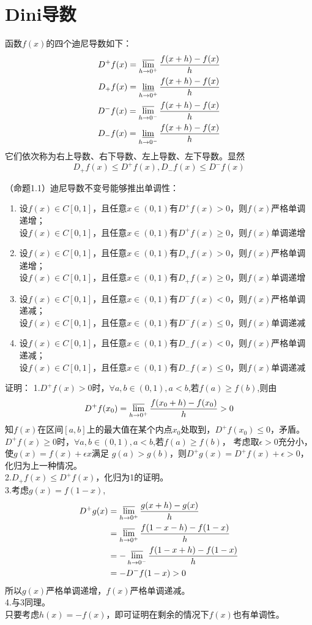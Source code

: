 \documentclass{ctexart}
\begin{document}
\section{Dini导数}
函数$f(x)$的四个迪尼导数如下：
\begin{align}
    D^+f(x)=\varlimsup_{h\to 0^+}\frac{f(x+h)-f(x)}{h} \\
    D_+f(x)=\varliminf_{h\to 0^+}\frac{f(x+h)-f(x)}{h} \\
    D^-f(x)=\varlimsup_{h\to 0^-}\frac{f(x+h)-f(x)}{h} \\
    D_-f(x)=\varliminf_{h\to 0^-}\frac{f(x+h)-f(x)}{h}
\end{align}
它们依次称为右上导数、右下导数、左上导数、左下导数。显然
\[D_+f(x)\leq D^+f(x),D_-f(x)\leq D^-f(x)\]

（命题1.1）迪尼导数不变号能够推出单调性：
\begin{enumerate}
    \item 设$f(x)\in C[0,1]$，且任意$x\in (0,1)$有$D^+f(x)>0$，则$f(x)$严格单调递增；\\
          设$f(x)\in C[0,1]$，且任意$x\in (0,1)$有$D^+f(x)\geq 0$，则$f(x)$单调递增
    \item 设$f(x)\in C[0,1]$，且任意$x\in (0,1)$有$D_+f(x)>0$，则$f(x)$严格单调递增；\\
          设$f(x)\in C[0,1]$，且任意$x\in (0,1)$有$D_+f(x)\geq 0$，则$f(x)$单调递增
    \item 设$f(x)\in C[0,1]$，且任意$x\in (0,1)$有$D^-f(x)<0$，则$f(x)$严格单调递减；\\
          设$f(x)\in C[0,1]$，且任意$x\in (0,1)$有$D^-f(x)\leq 0$，则$f(x)$单调递减
    \item 设$f(x)\in C[0,1]$，且任意$x\in (0,1)$有$D_-f(x)<0$，则$f(x)$严格单调递减；\\
          设$f(x)\in C[0,1]$，且任意$x\in (0,1)$有$D_-f(x)\leq 0$，则$f(x)$单调递减
\end{enumerate}
证明：
1.$D^+f(x)>0$时，$\forall a,b\in (0,1),a<b$,若$f(a)\geq f(b)$,则由
\[D^+f(x_0)=\varlimsup_{h\to 0^+}\frac{f(x_0+h)-f(x_0)}{h}>0\]
知$f(x)$在区间$[a,b]$上的最大值在某个内点$x_0$处取到，$D^+f(x_0)\leq 0$，矛盾。\\
$D^+f(x)\geq 0$时，$\forall a,b\in (0,1),a<b$,若$f(a)\geq f(b)$，
考虑取$\epsilon>0$充分小，使$g(x)=f(x)+\epsilon x$满足
$g(a)>g(b)$，则$D^+g(x)=D^+f(x)+\epsilon>0$，化归为上一种情况。\\
2.$D_+f(x)\leq D^+f(x)$，化归为1的证明。\\
3.考虑$g(x)=f(1-x)$,
\begin{align*}
    D^+g(x) & =\varlimsup_{h\to 0^+}\frac{g(x+h)-g(x)}{h}      \\
            & =\varlimsup_{h\to 0^+}\frac{f(1-x-h)-f(1-x)}{h}  \\
            & =-\varlimsup_{h\to 0^-}\frac{f(1-x+h)-f(1-x)}{h} \\
            & =-D^-f(1-x)>0
\end{align*}
所以$g(x)$严格单调递增，$f(x)$严格单调递减。\\
4.与3同理。\\
只要考虑$h(x)=-f(x)$，即可证明在剩余的情况下$f(x)$也有单调性。
\end{document}
